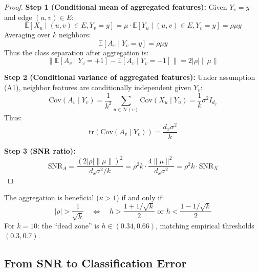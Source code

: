 \begin{proof}
\textbf{Step 1 (Conditional mean of aggregated features):}
Given $Y_v = y$ and edge $(u,v) \in E$:
\begin{equation}
    \mathbb{E}[X_u \mid (u,v) \in E, Y_v = y] = \mu \cdot \mathbb{E}[Y_u \mid (u,v) \in E, Y_v = y] = \rho \mu y
\end{equation}
Averaging over $k$ neighbors:
\begin{equation}
    \mathbb{E}[A_v \mid Y_v = y] = \rho \mu y
\end{equation}
Thus the class separation after aggregation is:
\begin{equation}
    \|\mathbb{E}[A_v \mid Y_v = +1] - \mathbb{E}[A_v \mid Y_v = -1]\| = 2|\rho| \|\mu\|
\end{equation}

\textbf{Step 2 (Conditional variance of aggregated features):}
Under assumption (A1), neighbor features are conditionally independent given $Y_v$:
\begin{equation}
    \mathrm{Cov}(A_v \mid Y_v) = \frac{1}{k^2} \sum_{u \in \mathcal{N}(v)} \mathrm{Cov}(X_u \mid Y_u) = \frac{1}{k} \sigma^2 I_{d_x}
\end{equation}
Thus:
\begin{equation}
    \mathrm{tr}(\mathrm{Cov}(A_v \mid Y_v)) = \frac{d_x \sigma^2}{k}
\end{equation}

\textbf{Step 3 (SNR ratio):}
\begin{equation}
    \mathrm{SNR}_A = \frac{(2|\rho| \|\mu\|)^2}{d_x \sigma^2 / k} = \rho^2 k \cdot \frac{4\|\mu\|^2}{d_x \sigma^2} = \rho^2 k \cdot \mathrm{SNR}_X
\end{equation}
\end{proof}

\begin{corollary}
\label{cor:threshold}
The aggregation is beneficial ($\kappa > 1$) if and only if:
\begin{equation}
    |\rho| > \frac{1}{\sqrt{k}} \quad \Leftrightarrow \quad h > \frac{1 + 1/\sqrt{k}}{2} \text{ or } h < \frac{1 - 1/\sqrt{k}}{2}
\end{equation}
For $k = 10$: the ``dead zone'' is $h \in (0.34, 0.66)$, matching empirical thresholds $(0.3, 0.7)$.
\end{corollary}

\subsection{From SNR to Classification Error}
\label{subsec:error}

